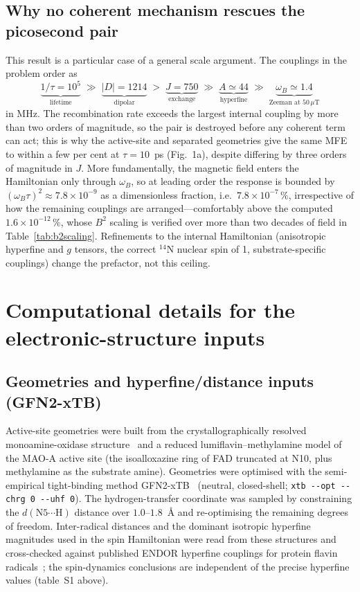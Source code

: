 \documentclass[11pt]{article}
\begin{document}
\subsection*{Why no coherent mechanism rescues the picosecond pair}
This result is a particular case of a general scale argument. The couplings in the
problem order as
\begin{equation}
\underbrace{1/\tau = 10^{5}}_{\text{lifetime}} \;\gg\;
\underbrace{|D| = 1214}_{\text{dipolar}} \;>\;
\underbrace{J = 750}_{\text{exchange}} \;\gg\;
\underbrace{A \simeq 44}_{\text{hyperfine}} \;\gg\;
\underbrace{\omega_B \simeq 1.4}_{\text{Zeeman at }50\,\mu\text{T}}
\end{equation}
in MHz. The recombination rate exceeds the largest internal coupling by more than
two orders of magnitude, so the pair is destroyed before any coherent term can
act; this is why the active-site and separated geometries give the same MFE to
within a few per cent at $\tau = 10$~ps (Fig.~1a), despite differing by three
orders of magnitude in $J$. More fundamentally, the magnetic field enters the
Hamiltonian only through $\omega_B$, so at leading order the response is bounded
by $(\omega_B\tau)^2 \approx 7.8\times10^{-9}$ as a dimensionless fraction, i.e.\
$7.8\times10^{-7}\,\%$, irrespective of how the remaining couplings are
arranged---comfortably above the computed
$1.6\times10^{-12}\,\%$, whose $B^2$ scaling is verified over more than two
decades of field in Table~\ref{tab:b2scaling}. Refinements to the internal Hamiltonian (anisotropic hyperfine
and $g$ tensors, the correct $^{14}$N nuclear spin of 1, substrate-specific
couplings) change the prefactor, not this ceiling.

\section{Computational details for the electronic-structure inputs}

\subsection{Geometries and hyperfine/distance inputs (GFN2-xTB)}
Active-site geometries were built from the crystallographically resolved
monoamine-oxidase structure~\cite{Edmondson2004main} and a reduced
lumiflavin--methylamine model of the MAO-A active site (the isoalloxazine ring of
FAD truncated at N10, plus methylamine as the substrate amine). Geometries were
optimised with the semi-empirical tight-binding method GFN2-xTB~\cite{Bannwarth2019}
(neutral, closed-shell; \texttt{xtb -{}-opt -{}-chrg 0 -{}-uhf 0}). The
hydrogen-transfer coordinate was sampled by constraining the
$d(\mathrm{N5}\cdots\mathrm{H})$ distance over $1.0$--$1.8$~\AA{} and
re-optimising the remaining degrees of freedom. Inter-radical distances and the
dominant isotropic hyperfine magnitudes used in the spin Hamiltonian were read
from these structures and cross-checked against published ENDOR hyperfine
couplings for protein flavin radicals~\cite{Weber1998}; the spin-dynamics
conclusions are independent of the precise hyperfine values (table~S1 above).
\end{document}
